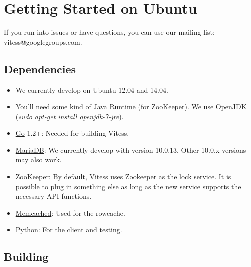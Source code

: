 \section{Getting Started on Ubuntu}\label{Getting-Started}

If you run into issues or have questions, you can use our mailing list: vitess@googlegroups.com.

\subsection{Dependencies}\label{dependencies}

\begin{itemize}
\item We currently develop on Ubuntu 12.04 and 14.04.
\item You'll need some kind of Java Runtime (for ZooKeeper).
We use OpenJDK (\emph{sudo apt-get install openjdk-7-jre}).
\item \href{http://golang.org}{Go} 1.2+: Needed for building Vitess.
\item \href{https://mariadb.org/}{MariaDB}: We currently develop with version 10.0.13.
Other 10.0.x versions may also work.
\item \href{http://zookeeper.apache.org/}{ZooKeeper}: By default, Vitess
uses Zookeeper as the lock service. It is possible to plug in
something else as long as the new service supports the
necessary API functions.
\item \href{http://memcached.org}{Memcached}: Used for the rowcache.
\item \href{http://python.org}{Python}: For the client and testing.
\end{itemize}

\subsection{Building}\hypertarget{building}{}\label{building}

